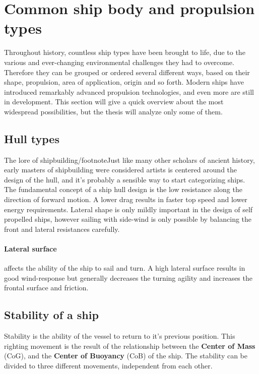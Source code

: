 \section{Common ship body and propulsion types}

Throughout history, countless ship types have been brought to life, due to the various and ever-changing environmental challenges they had to overcome. Therefore they can be grouped or ordered several different ways, based on their shape, propulsion, area of application, origin and so forth. Modern ships have introduced remarkably advanced propulsion technologies, and even more are still in development. This section will give a quick overview about the most widespread possibilities, but the thesis will analyze only some of them.

\subsection{Hull types}

The lore of shipbuilding/footnote{Just like many other scholars of ancient history, early masters of shipbuilding were considered artists \cite{Art_of_shipbuilding}} is centered around the design of the hull, and it's probably a sensible way to start categorizing ships.
The fundamental concept of a ship hull design is the low resistance along the direction of forward motion. A lower drag results in faster top speed and lower energy requirements. Lateral shape is only mildly important in the design of self propelled ships, however sailing with side-wind is only possible by balancing the front and lateral resistances carefully\cite{vitorlazas}.

\paragraph{Lateral surface} affects the ability of the ship to sail and turn. A high lateral surface results in good wind-response but generally decreases the turning agility and increases the frontal surface and friction.

\subsection{Stability of a ship} 

Stability is the ability of the vessel to return to it's previous position\cite{stability}. This righting movement is the result of the relationship between the \textbf{Center of Mass} (CoG), and the \textbf{Center of Buoyancy} (CoB) of the ship. The stability can be divided to three different movements, independent from each other.

